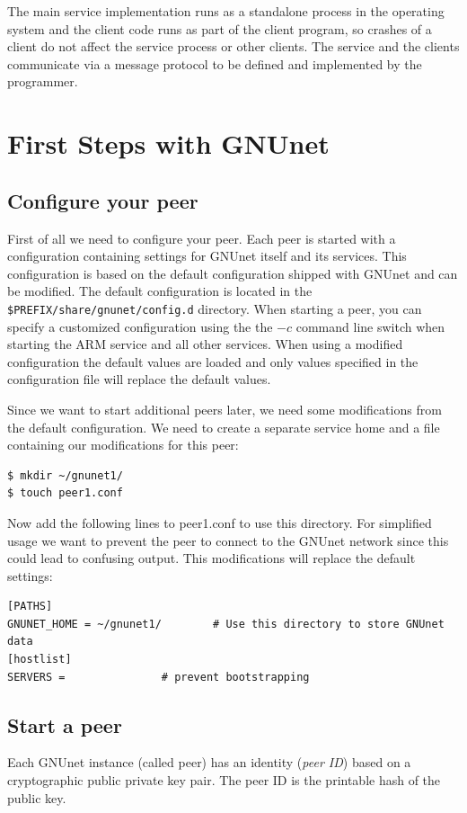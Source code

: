 \documentclass[10pt]{article}
\begin{document}
The main service implementation runs as a standalone process in the operating
system and the client code runs as part of the client program, so crashes of a
client do not affect the service process or other clients. The service and the
clients communicate via a message protocol to be defined and implemented by
the programmer.

\section{First Steps with GNUnet}

\subsection{Configure your peer}
First of all we need to configure your peer. Each peer is started with a configuration containing settings for GNUnet itself and its services. This configuration is based on the default configuration shipped with GNUnet and can be modified. The default configuration is located in the {\tt \$PREFIX/share/gnunet/config.d} directory. When starting a peer, you can specify a customized configuration using the the {\tt$-c$} command line switch when starting the ARM service and all other services. When using a modified configuration the default values are loaded and only values specified in the configuration file will replace the default values.

Since we want to start additional peers later, we need
some modifications from the default configuration. We need to create a separate service home and a file containing our modifications for this peer:
\begin{lstlisting}
$ mkdir ~/gnunet1/
$ touch peer1.conf
\end{lstlisting}

Now add the following lines to peer1.conf to use this directory. For
simplified usage we want to prevent the peer to connect to the GNUnet
network since this could lead to confusing output. This modifications
will replace the default settings:
\begin{lstlisting}
[PATHS]
GNUNET_HOME = ~/gnunet1/		# Use this directory to store GNUnet data
[hostlist]
SERVERS =				# prevent bootstrapping
\end{lstlisting}

\subsection{Start a peer}
Each GNUnet instance (called peer) has an identity (\textit{peer ID}) based on a
cryptographic public private key pair. The peer ID is the printable hash of the
public key.
\end{document}
